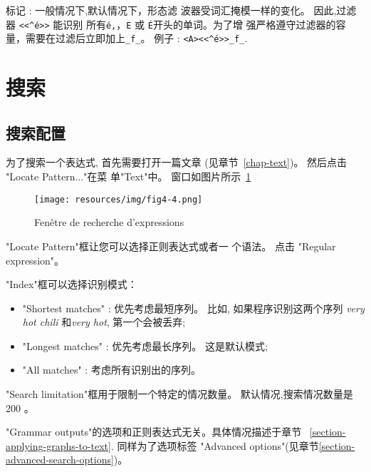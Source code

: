 \noindent {}标记 : 一般情况下,默认情况下，形态滤
波器受词汇掩模一样的变化。 因此,过滤器 \verb$<<^é>>$  能识别
所有\texttt{é,}，\texttt{E} 或 \texttt{É}开头的单词。为了增
强严格遵守过滤器的容量，需要在过滤后立即加上\verb+_f_+。 例子 : \verb+<A><<^é>>_f_+.



\section{搜索}
\subsection{搜索配置}
\label{section-configuration-recherche}
为了搜索一个表达式, 首先需要打开一篇文章 (见章节~\ref{chap-text})。 然后点击 "Locate Pattern..."在菜
单"Text"中。 窗口如图片所示~\ref{fig-regexp-search-configuration} 

\bigskip
\begin{figure}[h]
\begin{center}
\texttt{[image: resources/img/fig4-4.png]}
\caption{Fenêtre de recherche d’expressions\label{fig-regexp-search-configuration}}
\end{center}
\end{figure}

\noindent "Locate Pattern"框让您可以选择正则表达式或者一
个语法。 点击 "Regular expression"。


\bigskip
\noindent  "Index"框可以选择识别模式： 

\bigskip
{}
\begin{itemize}
  \item "Shortest matches" : 优先考虑最短序列。
  	  比如, 如果程序识别这两个序列 \textit{very hot chili} 和\textit{very hot}, 第一个会被丢弃;
  \item "Longest matches" : 优先考虑最长序列。 这是默认模式;
  \item "All matches" : 考虑所有识别出的序列。
\end{itemize}

\bigskip
\noindent  "Search limitation"框用于限制一个特定的情况数量。  默认情况,搜索情况数量是 200 。

\bigskip
\noindent  "Grammar outputs"的选项和正则表达式无关。具体情况描述于章节 
~\ref{section-applying-graphs-to-text}. 同样为了选项标签
"Advanced options"(见章节\ref{section-advanced-search-options})。

